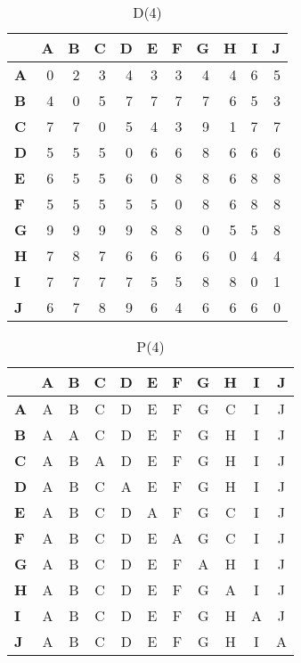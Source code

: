 \documentclass{article}
\begin{document}
\begin{table}[H]\centering
\caption{D(4)}
\begin{tabular}{l r r r r r r r r r r}
\toprule
 & \textbf{A} & \textbf{B} & \textbf{C} & \textbf{D} & \textbf{E} & \textbf{F} & \textbf{G} & \textbf{H} & \textbf{I} & \textbf{J}\\\midrule
\textbf{A} & 0 & 2 & 3 & 4 & 3 & 3 & 4 & 4 & 6 & 5 \\
\textbf{B} & 4 & 0 & 5 & 7 & 7 & 7 & 7 & 6 & 5 & 3 \\
\textbf{C} & 7 & 7 & 0 & 5 & 4 & 3 & 9 & 1 & 7 & 7 \\
\textbf{D} & 5 & 5 & 5 & 0 & 6 & 6 & 8 & 6 & 6 & 6 \\
\textbf{E} & 6 & 5 & 5 & 6 & 0 & 8 & 8 & 6 & 8 & 8 \\
\textbf{F} & 5 & 5 & 5 & 5 & 5 & 0 & 8 & 6 & 8 & 8 \\
\textbf{G} & 9 & 9 & 9 & 9 & 8 & 8 & 0 & 5 & 5 & 8 \\
\textbf{H} & 7 & 8 & 7 & 6 & 6 & 6 & 6 & 0 & 4 & 4 \\
\textbf{I} & 7 & 7 & 7 & 7 & 5 & 5 & 8 & 8 & 0 & 1 \\
\textbf{J} & 6 & 7 & 8 & 9 & 6 & 4 & 6 & 6 & 6 & 0 \\
\bottomrule
\end{tabular}
\end{table}

\begin{table}[H]\centering
\caption{P(4)}
\begin{tabular}{l c c c c c c c c c c}
\toprule
 & \textbf{A} & \textbf{B} & \textbf{C} & \textbf{D} & \textbf{E} & \textbf{F} & \textbf{G} & \textbf{H} & \textbf{I} & \textbf{J}\\\midrule
\textbf{A} & A & B & C & D & E & F & G & C & I & J \\
\textbf{B} & A & A & C & D & E & F & G & H & I & J \\
\textbf{C} & A & B & A & D & E & F & G & H & I & J \\
\textbf{D} & A & B & C & A & E & F & G & H & I & J \\
\textbf{E} & A & B & C & D & A & F & G & C & I & J \\
\textbf{F} & A & B & C & D & E & A & G & C & I & J \\
\textbf{G} & A & B & C & D & E & F & A & H & I & J \\
\textbf{H} & A & B & C & D & E & F & G & A & I & J \\
\textbf{I} & A & B & C & D & E & F & G & H & A & J \\
\textbf{J} & A & B & C & D & E & F & G & H & I & A \\
\bottomrule
\end{tabular}
\end{table}
\end{document}
